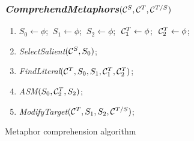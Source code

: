\begin{figure}[t]
  \vspace*{-2mm}
  \begin{center}\begin{minipage}[c]{100mm}
  \subsubsection*{{\it ComprehendMetaphors\/}$({\cal C}^S,{\cal C}^T,{\cal C}^{T/S})$}
    \small
    \begin{enumerate}
      \renewcommand{\theenumi}{}
      \renewcommand{\labelenumi}{}
      \addtolength{\itemsep}{-\parsep}
      \setlength{\labelsep}{-6ex}
    \item $S_0 \leftarrow \phi$; $~S_1 \leftarrow \phi$; $~S_2 \leftarrow \phi$;
      $~{\cal C}^T_1 \leftarrow \phi$; $~{\cal C}^T_2 \leftarrow \phi$;
    \item {\it SelectSalient\/}$({\cal C}^S,S_0)$;
    \item {\it FindLiteral\/}$({\cal C}^T,S_0,S_1,{\cal C}^T_1,{\cal C}^T_2)$;
    \item {\it ASM\/}$(S_0,{\cal C}^T_2,S_2)$;
    \item {\it ModifyTarget\/}$({\cal C}^T,S_1,S_2,{\cal C}^{T/S})$;
    \end{enumerate}
    \end{minipage}\end{center}
  \caption{Metaphor comprehension algorithm} \label{fig:algo}
\end{figure}


